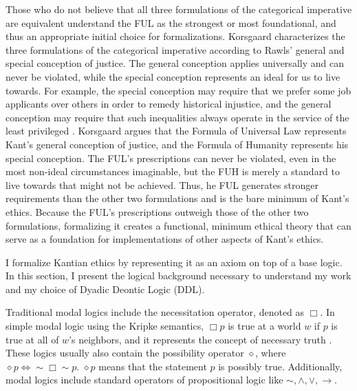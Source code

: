 \begin{isabellebody}
\begin{isamarkuptext}
Those who do not believe that all three formulations of the categorical imperative are equivalent
understand the FUL as the strongest or most foundational, and thus an appropriate initial choice for 
formalizations. Korsgaard characterizes the three formulations of the categorical
imperative according to Rawls' general and special conception of justice. The general conception applies
universally and can never be violated, while the special conception represents an ideal for us to
live towards. For example, the special conception may require that we prefer some job applicants
over others in order to remedy historical injustice, and the general conception may require that such
inequalities always operate in the service of the least privileged \citep[19]{KorsgaardRTL}. Korsgaard
argues that the Formula of Universal Law represents Kant's general conception of justice, and the Formula of 
Humanity represents his special conception. The FUL's prescriptions can never be violated, even in the most
non-ideal circumstances imaginable, but the FUH is merely a standard to live towards that might not be 
achieved. Thus, he FUL generates stronger requirements than the other two formulations and is 
the bare minimum of Kant's ethics. Because the FUL's prescriptions outweigh those of the other two formulations,
formalizing it creates a functional, minimum ethical theory that can serve as a foundation for implementations
of other aspects of Kant's ethics.%
\end{isamarkuptext}\isamarkuptrue%
%
\isadelimdocument
%
\endisadelimdocument
%
\isatagdocument
%
\isamarkuptrue%
%
\endisatagdocument
{\isafolddocument}%
%
\isadelimdocument
%
\endisadelimdocument
%
\begin{isamarkuptext}%
I formalize Kantian ethics by representing it as an axiom on top of a base logic. In this section, 
I present the logical background necessary to understand my work and my choice of Dyadic Deontic Logic (DDL).%
\end{isamarkuptext}\isamarkuptrue%
%
\begin{isamarkuptext}%
Traditional modal logics include the necessitation operator, denoted as $\Box$. In simple modal logic
using the Kripke semantics, $\Box p$ is true at a world $w$ if $p$ is true at all of $w$'s neighbors, 
and it represents the concept of necessary truth \citep{cresswell}. 
These logics usually also contain the possibility operator $\diamond$, where
 $\diamond p \iff \sim \Box \sim p$. $\diamond p$ means that the statement $p$ is possibly true. 
Additionally, modal logics include standard operators of propositional logic like $\sim, \wedge, \vee, \rightarrow$.


\end{isamarkuptext}
\end{isabellebody}
